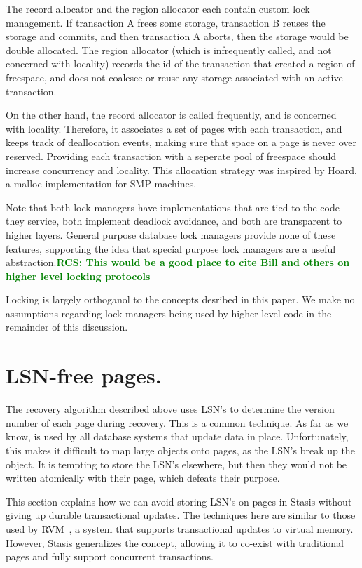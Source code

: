 \documentclass[letterpaper,twocolumn,10pt]{article}
\newcommand{\yad}{Stasis\xspace}
\newcommand{\rcs}[1]{\textcolor{green}{\bf RCS: #1}}
\begin{document}
The record allocator and the region allocator each contain custom lock
management.  If transaction A frees some storage, transaction B reuses
the storage and commits, and then transaction A aborts, then the
storage would be double allocated.  The region allocator (which is
infrequently called, and not concerned with locality) records the id
of the transaction that created a region of freespace, and does not
coalesce or reuse any storage associated with an active transaction.

On the other hand, the record allocator is called frequently, and is
concerned with locality.  Therefore, it associates a set of pages with
each transaction, and keeps track of deallocation events, making sure
that space on a page is never over reserved.  Providing each
transaction with a seperate pool of freespace should increase
concurrency and locality.  This allocation strategy was inspired by
Hoard, a malloc implementation for SMP machines.

Note that both lock managers have implementations that are tied to the
code they service, both implement deadlock avoidance, and both are
transparent to higher layers.  General purpose database lock managers
provide none of these features, supporting the idea that special
purpose lock managers are a useful abstraction.\rcs{This would be a
good place to cite Bill and others on higher level locking protocols}

Locking is largely orthoganol to the concepts desribed in this paper.
We make no assumptions regarding lock managers being used by higher
level code in the remainder of this discussion.

\section{LSN-free pages.}
\label{sec:lsn-free}
The recovery algorithm described above uses LSN's to determine the
version number of each page during recovery.  This is a common
technique.  As far as we know, is used by all database systems that
update data in place.  Unfortunately, this makes it difficult to map
large objects onto pages, as the LSN's break up the object.  It
is tempting to store the LSN's elsewhere, but then they would not be
written atomically with their page, which defeats their purpose.

This section explains how we can avoid storing LSN's on pages in \yad
without giving up durable transactional updates.  The techniques here
are similar to those used by RVM~\cite{lrvm}, a system that supports
transactional updates to virtual memory.  However, \yad generalizes
the concept, allowing it to co-exist with traditional pages and fully
support concurrent transactions.
\end{document}
